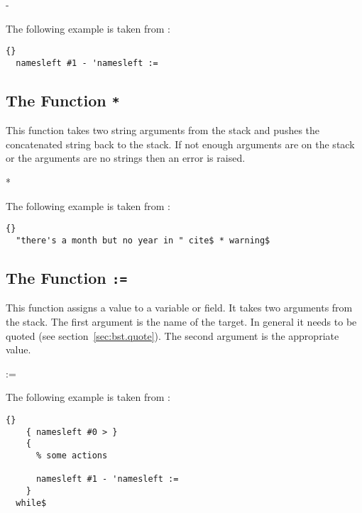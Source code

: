 \begin{BstFunction}{-}
\end{BstFunction}

The following example is taken from :

\begin{lstlisting}{}
  namesleft #1 - 'namesleft :=
\end{lstlisting}\fctIndex{-}\fctIndex{:=}


\subsection{The Function \texttt{*}}%
\fctIndex{*}

This function takes two string arguments from the stack and pushes the
concatenated string back to the stack. If not enough arguments are on
the stack or the arguments are no strings then an error is raised.

\begin{BstFunction}{*}
\end{BstFunction}

The following example is taken from :

\begin{lstlisting}{}
  "there's a month but no year in " cite$ * warning$
\end{lstlisting}


\subsection{The Function \texttt{:=}}%
\fctIndex{:=}

This function assigns a value to a variable or field. It takes two
arguments from the stack. The first argument is the name of the
target. In general it needs to be quoted (see
section~\ref{sec:bst.quote}). The second argument is the appropriate
value.

\begin{BstFunction}{:=}
\end{BstFunction}

The following example is taken from :

\begin{lstlisting}{}
    { namesleft #0 > }
    { 
      % some actions

      namesleft #1 - 'namesleft :=
    }
  while$
\end{lstlisting}\fctIndex{>}\fctIndex{-}\fctIndex{:=}


